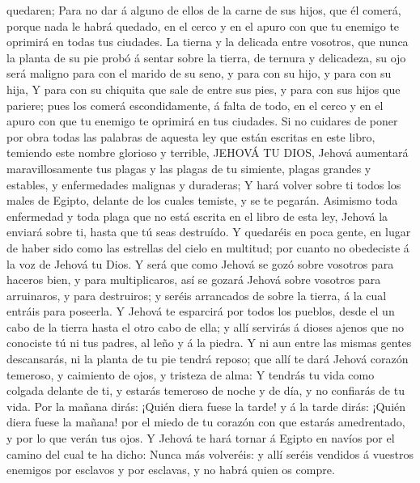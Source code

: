 quedaren;  Para no dar á alguno de ellos de la carne de
sus hijos, que él comerá, porque nada le habrá quedado, en el cerco y en
el apuro con que tu enemigo te oprimirá en todas tus ciudades.
 La tierna y la delicada entre vosotros, que nunca la
planta de su pie probó á sentar sobre la tierra, de ternura y
delicadeza, su ojo será maligno para con el marido de su seno, y para
con su hijo, y para con su hija,  Y para con su chiquita
que sale de entre sus pies, y para con sus hijos que pariere; pues los
comerá escondidamente, á falta de todo, en el cerco y en el apuro con
que tu enemigo te oprimirá en tus ciudades.  Si no
cuidares de poner por obra todas las palabras de aquesta ley que están
escritas en este libro, temiendo este nombre glorioso y terrible, JEHOVÁ
TU DIOS,  Jehová aumentará maravillosamente tus plagas y
las plagas de tu simiente, plagas grandes y estables, y enfermedades
malignas y duraderas;  Y hará volver sobre ti todos los
males de Egipto, delante de los cuales temiste, y se te pegarán.
 Asimismo toda enfermedad y toda plaga que no está
escrita en el libro de esta ley, Jehová la enviará sobre ti, hasta que
tú seas destruído.  Y quedaréis en poca gente, en lugar
de haber sido como las estrellas del cielo en multitud; por cuanto no
obedeciste á la voz de Jehová tu Dios.  Y será que como
Jehová se gozó sobre vosotros para haceros bien, y para multiplicaros,
así se gozará Jehová sobre vosotros para arruinaros, y para destruiros;
y seréis arrancados de sobre la tierra, á la cual entráis para poseerla.
 Y Jehová te esparcirá por todos los pueblos, desde el un
cabo de la tierra hasta el otro cabo de ella; y allí servirás á dioses
ajenos que no conociste tú ni tus padres, al leño y á la piedra.
 Y ni aun entre las mismas gentes descansarás, ni la
planta de tu pie tendrá reposo; que allí te dará Jehová corazón
temeroso, y caimiento de ojos, y tristeza de alma:  Y
tendrás tu vida como colgada delante de ti, y estarás temeroso de noche
y de día, y no confiarás de tu vida.  Por la mañana
dirás: ¡Quién diera fuese la tarde! y á la tarde dirás: ¡Quién diera
fuese la mañana! por el miedo de tu corazón con que estarás amedrentado,
y por lo que verán tus ojos.  Y Jehová te hará tornar á
Egipto en navíos por el camino del cual te ha dicho: Nunca más
volveréis: y allí seréis vendidos á vuestros enemigos por esclavos y por
esclavas, y no habrá quien os compre.

